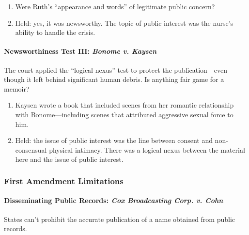 \begin{enumerate}
    \item Were Ruth's ``appearance and words'' of legitimate public concern?
    \item Held: yes, it was newsworthy. The topic of public interest was the 
    nurse's ability to handle the crisis.
\end{enumerate}

\paragraph{Newsworthiness Test III: \emph{Bonome v. Kaysen}}

The court applied the ``logical nexus'' test to protect the publication---even 
though it left behind significant human debris. Is anything fair game for a 
memoir?

\begin{enumerate}
    \item Kaysen wrote a book that included scenes from her romantic 
    relationship with Bonome---including scenes that attributed aggressive 
    sexual force to him.
    \item Held: the issue of public interest was the line between consent and 
    non-consensual physical intimacy. There was a logical nexus between the 
    material here and the issue of public interest.
\end{enumerate}

\subsubsection{First Amendment Limitations}

\paragraph{Disseminating Public Records: \emph{Cox Broadcasting Corp. v. Cohn}}

States can't prohibit the accurate publication of a name obtained from public 
records.

